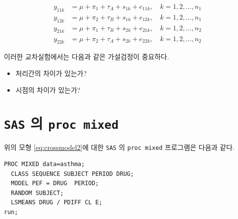 \documentclass[
]{book}
\providecommand{\tightlist}{%
  \setlength{\itemsep}{0pt}\setlength{\parskip}{0pt}}
\theoremstyle{definition}
\theoremstyle{definition}
\theoremstyle{definition}
\theoremstyle{remark}
\begin{document}
\begin{align*}
y_{11k} & = \mu + \pi_1 + \tau_A + s_{1k} + e_{11k}, \quad k=1,2,\dots, n_1 \\
y_{12k} & = \mu + \pi_2 + \tau_B + s_{1k} + e_{12k}, \quad k=1,2,\dots, n_1 \\
y_{21k} & = \mu + \pi_1 + \tau_B + s_{2k} + e_{21k}, \quad k=1,2,\dots, n_2 \\
y_{22k} & = \mu + \pi_2 + \tau_A + s_{2k} + e_{22k}, \quad k=1,2,\dots, n_2 
\end{align*}

이러한 교차실험에서는 다음과 같은 가설검정이 중요하다.

\begin{itemize}
\tightlist
\item
  처리간의 차이가 있는가?
\item
  시점의 차이가 있는가?
\end{itemize}

\hypertarget{sas-uxc758-proc-mixed}{%
\section{\texorpdfstring{\texttt{SAS} 의 \texttt{proc\ mixed}}{SAS 의 proc mixed}}\label{sas-uxc758-proc-mixed}}

위의 모형 \eqref{eq:crossmodel2}에 대한 \texttt{SAS} 의 \texttt{proc\ mixed} 프로그램은 다음과 같다.

\begin{verbatim}
PROC MIXED data=asthma;
  CLASS SEQUENCE SUBJECT PERIOD DRUG;
  MODEL PEF = DRUG  PERIOD;
  RANDOM SUBJECT;
  LSMEANS DRUG / PDIFF CL E;
run;
\end{verbatim}

  
\end{document}

